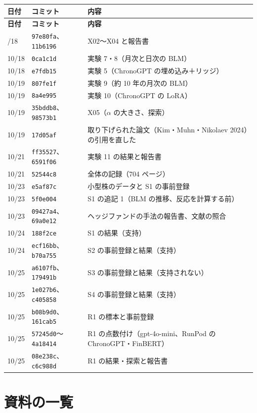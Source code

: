 \documentclass[xelatex,ja=standard,jafont=haranoaji,a4paper,10pt]{bxjsreport}
\newcommand{\code}[1]{\texttt{#1}}
\begin{document}
\begin{longtable}{p{1.6cm}p{1.6cm}p{10.6cm}}
\toprule
\textbf{日付} & \textbf{コミット} & \textbf{内容} \\
\midrule
\endfirsthead
\toprule
\textbf{日付} & \textbf{コミット} & \textbf{内容} \\
\midrule
\endhead
\bottomrule
\endfoot
10/18 & \code{97e80fa}、\code{11b6196} & X02〜X04 と報告書 \\
10/18 & \code{0ca1c1d} & 実験 7・8（月次と日次の BLM） \\
10/18 & \code{e7fdb15} & 実験 5（ChronoGPT の埋め込み＋リッジ） \\
10/19 & \code{807fe1f} & 実験 9（約 10 年の月次の BLM） \\
10/19 & \code{8a4e995} & 実験 10（ChronoGPT の LoRA） \\
10/19 & \code{35bddb8}、\code{98573b1} & X05（$\alpha$ の大きさ、探索） \\
10/19 & \code{17d05af} & 取り下げられた論文（Kim・Muhn・Nikolaev 2024）の引用を直した \\
10/21 & \code{ff35527}、\code{6591f06} & 実験 11 の結果と報告書 \\
10/21 & \code{52544c8} & 全体の記録（704 ページ） \\
10/23 & \code{e5af87c} & 小型株のデータと S1 の事前登録 \\
10/23 & \code{5f0e004} & S1 の追記 1（BLM の推移、反応を計算する前） \\
10/23 & \code{09427a4}、\code{69a0e12} & ヘッジファンドの手法の報告書、文献の照合 \\
10/24 & \code{188f2ce} & S1 の結果（支持） \\
10/24 & \code{ecf16bb}、\code{b70a755} & S2 の事前登録と結果（支持） \\
10/25 & \code{a6107fb}、\code{179491b} & S3 の事前登録と結果（支持されない） \\
10/25 & \code{1e027b6}、\code{c405858} & S4 の事前登録と結果（支持） \\
10/25 & \code{b08b9d0}、\code{161cab5} & R1 の標本と事前登録 \\
10/25 & \code{57245d0}〜\code{4a18414} & R1 の点数付け（gpt-4o-mini、RunPod の ChronoGPT・FinBERT） \\
10/25 & \code{08e238c}、\code{c6c988d} & R1 の結果・探索と報告書 \\
\end{longtable}

\chapter{資料の一覧}\label{app:docs}
\end{document}
